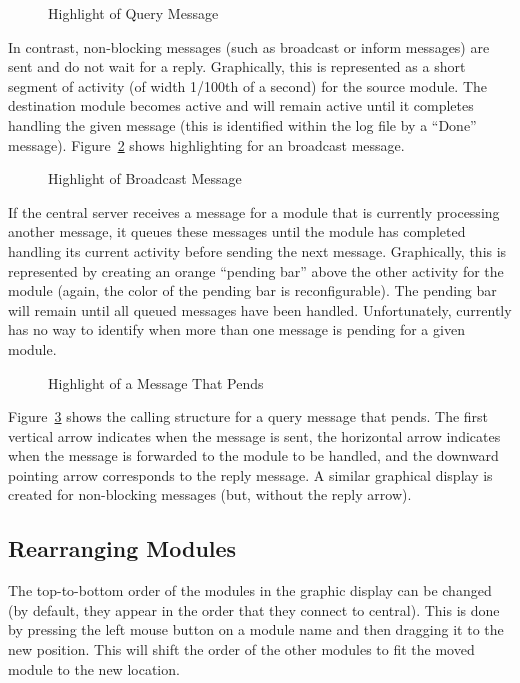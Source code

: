 \begin{figure}[htp]
\centerline{\epsfysize=2in }
\caption{Highlight of Query Message}
\label{fig:query}
\end{figure}

In contrast, non-blocking messages (such as broadcast or inform messages) are
sent and do not
wait for a reply. Graphically, this is represented as a short segment
of activity (of width 1/100th of a second) for the source module. The
destination module becomes active and will remain active until it
completes handling the given message (this is identified within the
log file by a ``Done'' message). Figure~\ref{fig:broadcast} shows
highlighting for an broadcast message.

\begin{figure}[htp]
\centerline{\epsfysize=2in }
\caption{Highlight of Broadcast Message}
\label{fig:broadcast}
\end{figure}

If the central server receives a message for a module that is
currently processing another message, it queues these messages until
the module has completed handling its current activity before sending
the next message. Graphically, this is represented by creating an
orange ``pending bar'' above the other activity for the module (again,
the color of the pending bar is reconfigurable). The pending bar will
remain until all queued messages have been handled. Unfortunately,
\comview{} currently has no way to identify when more than one message is
pending for a given module.

\begin{figure}[htp]
\centerline{\epsfysize=2.0in }
\caption{Highlight of a Message That Pends}
\label{fig:pend}
\end{figure}

Figure~\ref{fig:pend} shows the calling structure for a query message
that pends. The first vertical arrow indicates when the message is
sent, the horizontal arrow indicates when the message is forwarded to
the module to be handled, and the downward pointing arrow corresponds
to the reply message. A similar graphical display is created for
non-blocking messages (but, without the reply arrow).

\subsection{Rearranging Modules}

The top-to-bottom order of the modules in the graphic display can be changed
(by default, they appear in the order that they connect to central). This
is done by pressing the left mouse button on a module name and then
dragging it to the new position. This will shift the order of the
other modules to fit the moved module to the new location.

